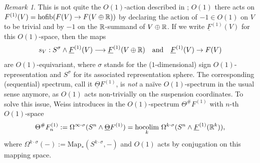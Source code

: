 \documentclass[a4paper, oneside]{amsart}
\DeclareMathOperator{\hocolim}{\operatorname{hocolim}}
\newcommand{\hofib}{\operatorname{hofib}}
\newcommand{\1}{\mathds{1}}
\theoremstyle{remark}
\newtheorem{rem}[thm]{Remark}%
\theoremstyle{definition}
\newcommand{\R}{{\scaleobj{0.97}{\mathbb{R}}}}
\numberwithin{equation}{section}
\begin{document}
\begin{rem}\label{orthcalcinvolutionrem}
This is not quite the $O(1)$-action described in \cite[Prop. 3.1]{WeissOrthCalc}; $O(1)$ there acts on $F^{(1)}(V)=\hofib(F(V)\to F(V\oplus \R))$ by declaring the action of $-1\in O(1)$ on $V$ to be trivial and by $-1$ on the $\R$-summand of $V\oplus \R$. If we write $\underline{F}^{(1)}(V)$ for this $O(1)$-space, then the maps 
\begin{equation}\label{underlineFstabmap}
s_V: S^{\sigma}\wedge \underline{F}^{(1)}(V)\longrightarrow \underline{F}^{(1)}(V\oplus \R) \quad\text{and}\quad \underline{F}^{(1)}(V)\to F(V)
\end{equation}
are $O(1)$-equivariant, where $\sigma$ stands for the ($1$-dimensional) sign $O(1)$-representation and $S^\sigma$ for its associated representation sphere. The corresponding (sequential) spectrum, call it $\underline{\Theta}F^{(1)}$, is \textit{not} a naïve $O(1)$-spectrum in the usual sense anymore, as $O(1)$ acts non-trivially on the suspension coordinates. To solve this issue, Weiss introduces in \cite[p. 17]{WeissOrthCalc} the $O(1)$-spectrum $\Theta^\#F^{(1)}$ with $n$-th $O(1)$-space
\begin{equation}\label{Thetasharpdefn}
\Theta^\#F^{(1)}_n:=\Omega^{\infty\cdot \sigma}(S^n\wedge \underline\Theta F^{(1)})=\underset{k}{\hocolim}\ \Omega^{k\cdot\sigma}(S^n\wedge \underline{F}^{(1)}(\R^k)),
\end{equation}
where $\Omega^{k\cdot\sigma}(-):=\mathrm{Map}_*(S^{k\cdot\sigma},-)$ and $O(1)$ acts by conjugation on this mapping space. 


\end{rem}
\end{document}
